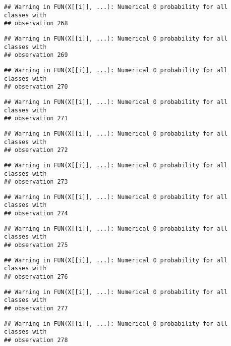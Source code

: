 \documentclass[
]{article}
\begin{document}
\begin{verbatim}
## Warning in FUN(X[[i]], ...): Numerical 0 probability for all classes with
## observation 268
\end{verbatim}

\begin{verbatim}
## Warning in FUN(X[[i]], ...): Numerical 0 probability for all classes with
## observation 269
\end{verbatim}

\begin{verbatim}
## Warning in FUN(X[[i]], ...): Numerical 0 probability for all classes with
## observation 270
\end{verbatim}

\begin{verbatim}
## Warning in FUN(X[[i]], ...): Numerical 0 probability for all classes with
## observation 271
\end{verbatim}

\begin{verbatim}
## Warning in FUN(X[[i]], ...): Numerical 0 probability for all classes with
## observation 272
\end{verbatim}

\begin{verbatim}
## Warning in FUN(X[[i]], ...): Numerical 0 probability for all classes with
## observation 273
\end{verbatim}

\begin{verbatim}
## Warning in FUN(X[[i]], ...): Numerical 0 probability for all classes with
## observation 274
\end{verbatim}

\begin{verbatim}
## Warning in FUN(X[[i]], ...): Numerical 0 probability for all classes with
## observation 275
\end{verbatim}

\begin{verbatim}
## Warning in FUN(X[[i]], ...): Numerical 0 probability for all classes with
## observation 276
\end{verbatim}

\begin{verbatim}
## Warning in FUN(X[[i]], ...): Numerical 0 probability for all classes with
## observation 277
\end{verbatim}

\begin{verbatim}
## Warning in FUN(X[[i]], ...): Numerical 0 probability for all classes with
## observation 278
\end{verbatim}
\end{document}
